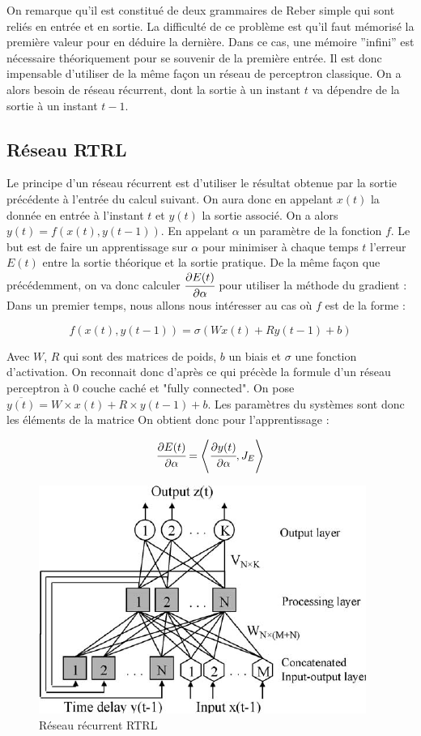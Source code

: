 On remarque qu'il est constitué de deux grammaires de Reber simple qui sont reliés en entrée et en sortie.
La difficulté de ce problème est qu'il faut mémorisé la première valeur pour en déduire la dernière.
Dans ce cas, une mémoire ''infini'' est nécessaire théoriquement pour se souvenir de la première entrée.
Il est donc impensable d'utiliser de la même façon un réseau de perceptron classique. On a alors besoin de réseau récurrent, dont la sortie à un instant $t$ va dépendre de la sortie à un instant $t-1$.

\subsection{Réseau RTRL}

Le principe d'un réseau récurrent est d'utiliser le résultat obtenue par la sortie précédente à l'entrée du calcul suivant.
On aura donc en appelant $x(t)$ la donnée en entrée à l'instant $t$ et $y(t)$ la sortie associé.
On a alors $y(t) = f(x(t), y(t-1))$.
En appelant $\alpha$ un paramètre de la fonction $f$.
Le but est de faire un apprentissage sur $\alpha$ pour minimiser à chaque temps $t$ l'erreur $E(t)$ entre la sortie théorique et la sortie pratique.
De la même façon que précédemment, on va donc calculer $\cfrac{\partial E(t)}{\partial \alpha}$ pour utiliser la méthode du gradient :
Dans un premier temps, nous allons nous intéresser au cas où $f$ est de la forme :

\[ f(x(t), y(t-1)) = \sigma\left (W x(t) + R y(t-1) + b\right )\]

Avec $W$, $R$ qui sont des matrices de poids, $b$ un biais et $\sigma$ une fonction d'activation.
On reconnait donc d'après ce qui précède la formule d'un réseau perceptron à $0$ couche caché et "fully connected".
On pose $\overline{y(t)} = W\times x(t) + R\times y(t-1) + b$.
Les paramètres du systèmes sont donc les éléments de la matrice
On obtient donc pour l'apprentissage :

\[\cfrac{\partial E(t)}{\partial \alpha} = \left\langle \cfrac{\partial y(t)}{\partial \alpha}, J_E \right\rangle\]

\begin{figure}[!ht]
\begin{center}
\includegraphics[scale=0.8]{images/rtrl.png}
\end{center}
\caption{Réseau récurrent RTRL}
\end{figure}

